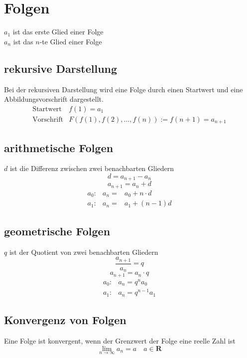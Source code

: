 \section{Folgen}
$a_1$ ist das erste Glied einer Folge\\
$a_n$ ist das $n$-te Glied einer Folge

\subsection{rekursive Darstellung}
Bei der rekursiven Darstellung wird eine Folge durch einen Startwert und eine Abbildungsvorschrift dargestellt. \\
\[ \boxed{ \begin{matrix}
\text{Startwert} & f(1) = a_1 \\
\text{Vorschrift} & F(f(1), f(2), \ldots, f(n)) := f(n + 1) = a_{n + 1}
\end{matrix}} \]

\subsection{arithmetische Folgen}
$d$ ist die Differenz zwischen zwei benachbarten Gliedern\\
\[ \boxed{d = a_{n+1} - a_n} \]
\[ \boxed{a_{n+1} = a_n + d} \]
\[ \boxed{ \begin{matrix} 
a_0 :& a_n =& a_0 + n \cdot d \\
a_1 :& a_n =& a_1 + (n - 1)d 
\end{matrix}}\]

\subsection{geometrische Folgen}
$q$ ist der Quotient von zwei benachbarten Gliedern\\
\[ \boxed{\frac{a_{n+1}}{a_n} = q} \]
\[ \boxed{a_{n+1} = a_n \cdot q} \]
\[ \boxed{\begin{array}{ll}
a_0 :& a_n = q^{n} a_0\\
a_1 :& a_n = q^{n-1} a_1
\end{array}} \]

\subsection{Konvergenz von Folgen}
Eine Folge ist konvergent, wenn der Grenzwert der Folge eine reelle Zahl ist
\[ \boxed{\lim\limits_{n \to \infty} a_n = a \quad a \in \mathbf{R}}\]

